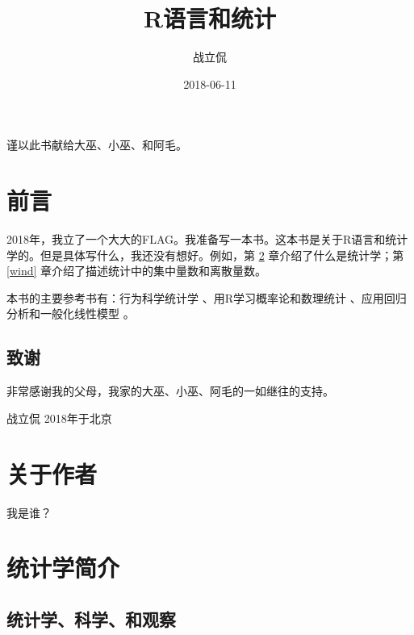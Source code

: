 \documentclass[]{ctexbook}
\title{R语言和统计}
\author{战立侃}
\date{2018-06-11}
\let\BeginKnitrBlock\begin \let\EndKnitrBlock\end
\begin{document}
\maketitle


\thispagestyle{empty}

\begin{center}
谨以此书献给大巫、小巫、和阿毛。
\end{center}

\setlength{\abovedisplayskip}{-5pt}
\setlength{\abovedisplayshortskip}{-5pt}

{
\setcounter{tocdepth}{2}
\tableofcontents
}
\listoftables
\listoffigures
\chapter*{前言}


2018年，我立了一个大大的FLAG。我准备写一本书。这本书是关于R语言和统计学的。但是具体写什么，我还没有想好。例如，第
\ref{Introduction-to-Statistics} 章介绍了什么是统计学；第 \ref{wind}
章介绍了描述统计中的集中量数和离散量数。

本书的主要参考书有：行为科学统计学
\citep{RN154}、用R学习概率论和数理统计
\citep{RN261}、应用回归分析和一般化线性模型 \citep{RN146}。

\section*{致谢}


非常感谢我的父母，我家的大巫、小巫、阿毛的一如继往的支持。

\BeginKnitrBlock{flushright}
战立侃 2018年于北京
\EndKnitrBlock{flushright}

\hypertarget{author.unnumbered}{%
\chapter{关于作者}\label{author.unnumbered}}

我是谁？

\mainmatter

\hypertarget{Introduction-to-Statistics}{%
\chapter{统计学简介}\label{Introduction-to-Statistics}}

\section{统计学、科学、和观察}
\end{document}
